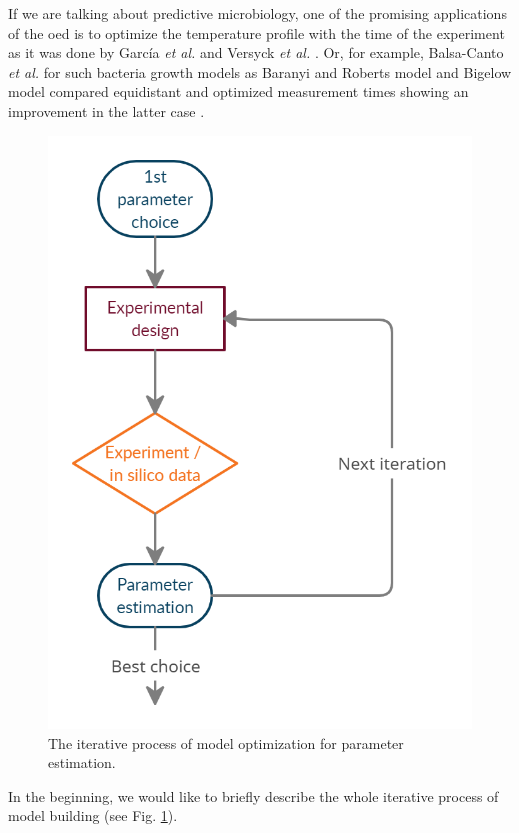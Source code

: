 \documentclass[10pt,A4paper]{article}
\newcommand{\etal}{{\textit{et al. }}}
\begin{document}
If we are talking about predictive microbiology, one of the promising applications of the \ac{oed} is to optimize the temperature profile with the time of the experiment as it was done by García \etal \cite{garciaQualityShelflifePrediction2015} and Versyck \etal \cite{versyckIntroducingOptimal1999}.
Or, for example, Balsa-Canto \etal for such bacteria growth models as Baranyi and Roberts model and Bigelow model compared equidistant and optimized measurement times showing an improvement in the latter case \cite{balsa-cantoe.bangaj.r.COMPUTINGOPTIMALDYNAMIC2008}.
\begin{figure}[H]
    \centering
    \includegraphics[scale=0.25]{Figures/scheme.png}
    \caption{{\footnotesize The iterative process of model optimization for parameter estimation.}}
    \label{fig:expdesign_scheme}
\end{figure}
In the beginning, we would like to briefly describe the whole iterative process of model building (see Fig. \ref{fig:expdesign_scheme}).
\end{document}
